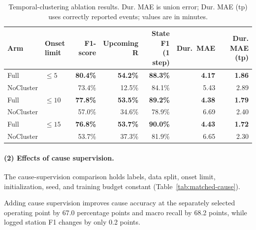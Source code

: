 \begin{table}[!htbp]
\centering
\caption{Temporal-clustering ablation results. Dur. MAE is union error; Dur. MAE (tp) uses correctly reported events; values are in minutes.}
\label{tab:group-ablation}
\footnotesize
\setlength{\tabcolsep}{3.5pt}
\renewcommand{\arraystretch}{1.08}
\begin{fittable}
\begin{tabular*}{\linewidth}{@{\extracolsep{\fill}}llrrrrr@{}}
\toprule
Arm & \makecell{Onset\\limit} & F1-score & \makecell{Upcoming\\R} & \makecell{State F1\\(1 step)} & Dur.\ MAE & \makecell{Dur. MAE\\(tp)} \\
\midrule
Full & $\leq5$ & \textbf{80.4\%} & \textbf{54.2\%} & \textbf{88.3\%} & \textbf{4.17} & \textbf{1.86} \\
NoCluster & & 73.4\% & 12.5\% & 84.1\% & 5.43 & 2.89 \\
\midrule
Full & $\leq10$ & \textbf{77.8\%} & \textbf{53.5\%} & \textbf{89.2\%} & \textbf{4.38} & \textbf{1.79} \\
NoCluster & & 57.0\% & 34.6\% & 78.9\% & 6.69 & 2.40 \\
\midrule
Full & $\leq15$ & \textbf{76.8\%} & \textbf{53.7\%} & \textbf{90.0\%} & \textbf{4.43} & \textbf{1.72} \\
NoCluster & & 53.7\% & 37.3\% & 81.9\% & 6.65 & 2.30 \\
\bottomrule
\end{tabular*}
\end{fittable}
\end{table}

\paragraph*{(2) Effects of cause supervision.}
The cause-supervision comparison holds labels, data split, onset limit, initialization, seed, and training budget constant (Table~\ref{tab:matched-cause}).

Adding cause supervision improves cause accuracy at the separately selected operating point by 67.0 percentage points and macro recall by 68.2 points, while logged station F1 changes by only 0.2 points.

